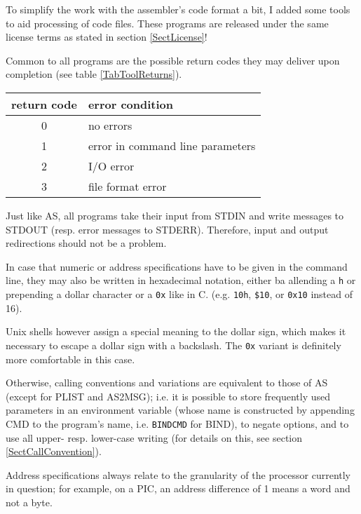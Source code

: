 \documentclass[12pt,twoside]{report}
\newcommand{\tty}[1]{{\tt #1}}
\newcommand{\asname}{{AS}}
\begin{document}
To simplify the work with the assembler's code format a bit, I added
some tools to aid processing of code files.  These programs are
released under the same license terms as stated in section
\ref{SectLicense}!

Common to all programs are the possible return codes they may deliver
upon completion (see table \ref{TabToolReturns}).
\par
\begin{table*}[h]
\begin{center}\begin{tabular}{|c|l|}
\hline
return code   & error condition \\
\hline
\hline
0             & no errors \\
1             & error in command line parameters \\
2             & I/O error \\
3             & file format error \\
\hline
\end{tabular}\end{center}
\caption{Return Codes of the Utility Programs\label{TabToolReturns}}
\end{table*}
Just like \asname{}, all programs take their input from STDIN and write
messages to STDOUT (resp. error messages to STDERR).  Therefore,
input and output redirections should not be a problem.

In case that numeric or address specifications have to be given in
the command line, they may also be written in hexadecimal
notation,  either ba allending a \verb!h! or prepending a dollar
character or a \tty{0x} like in C.
(e.g. \verb!10h!, \verb!$10!, or \verb!0x10! instead of 16).

Unix shells however  assign a special meaning to the
dollar sign, which makes it necessary to escape a dollar sign with a
backslash.  The \tty{0x} variant is definitely more comfortable in this case.

Otherwise, calling conventions and variations are equivalent to those
of \asname{} (except for PLIST and AS2MSG); i.e. it is possible to store
frequently used parameters in an environment variable (whose name is
constructed by appending CMD to the program's name, i.e. \tty{BINDCMD} for
BIND), to negate options, and to use all upper- resp. lower-case
writing (for details on this, see section \ref{SectCallConvention}).

Address specifications always relate to the granularity of the
processor currently in question; for example, on a PIC, an address
difference of 1 means a word and not a byte.
\end{document}
